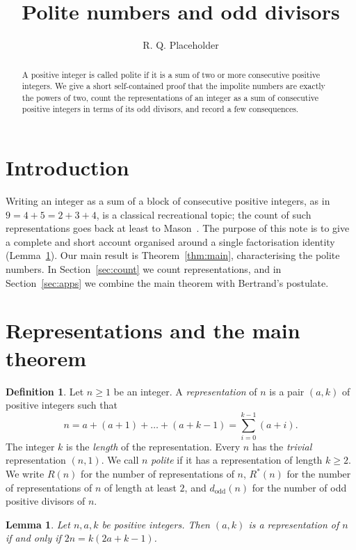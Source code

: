 \documentclass[11pt]{amsart}
\title{Polite numbers and odd divisors}
\author{R. Q. Placeholder}
\date{}
\newtheorem{lemma}[theorem]{Lemma}
\theoremstyle{definition}
\newtheorem{definition}[theorem]{Definition}
\theoremstyle{remark}
\begin{document}
\begin{abstract}
A positive integer is called polite if it is a sum of two or more consecutive
positive integers. We give a short self-contained proof that the impolite
numbers are exactly the powers of two, count the representations of an
integer as a sum of consecutive positive integers in terms of its odd
divisors, and record a few consequences.
\end{abstract}

\maketitle

\section{Introduction}

Writing an integer as a sum of a block of consecutive positive integers, as in
$9=4+5=2+3+4$, is a classical recreational topic; the count of such
representations goes back at least to Mason~\cite{Mas}. The purpose of this
note is to give a complete and short account organised around a single
factorisation identity (Lemma~\ref{lem:identity}). Our main result is
Theorem~\ref{thm:main}, characterising the polite numbers. In
Section~\ref{sec:count} we count representations, and in
Section~\ref{sec:apps} we combine the main theorem with Bertrand's postulate.

\section{Representations and the main theorem}

\begin{definition}\label{def:rep}
Let $n\ge 1$ be an integer. A \emph{representation} of $n$ is a pair $(a,k)$ of
positive integers such that
\[
  n=a+(a+1)+\dots+(a+k-1)=\sum_{i=0}^{k-1}(a+i).
\]
The integer $k$ is the \emph{length} of the representation. Every $n$ has the
\emph{trivial} representation $(n,1)$. We call $n$ \emph{polite} if it has a
representation of length $k\ge 2$. We write $R(n)$ for the number of
representations of $n$, $R^{*}(n)$ for the number of representations of $n$ of
length at least $2$, and $d_{\mathrm{odd}}(n)$ for the number of odd positive
divisors of $n$.
\end{definition}

\begin{lemma}\label{lem:identity}
Let $n,a,k$ be positive integers. Then $(a,k)$ is a representation of $n$ if
and only if $2n=k(2a+k-1)$.
\end{lemma}
\end{document}
